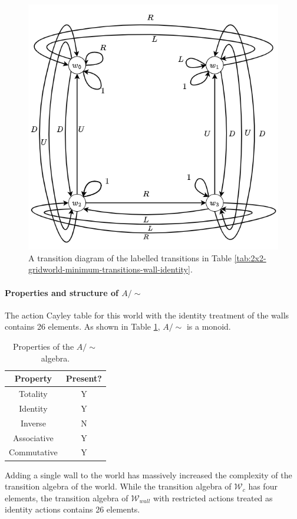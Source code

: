 \begin{figure}
    \centering
    \includegraphics[width=0.5\linewidth]{5BeyondSBDRL/Old/Images/identity-walls-2x2-cyclical-min-actions.drawio.png}
    \caption{
    A transition diagram of the labelled transitions in Table \ref{tab:2x2-gridworld-minimum-transitions-wall-identity}.
    }
    \label{fig:2x2-cyclical-min-actions-wall-identity}
\end{figure}

\paragraph{Properties and structure of $A/\sim$}
The action Cayley table for this world with the identity treatment of the walls contains 26 elements.
As shown in Table \ref{tab:identity-walls-properties}, $A/\sim$ is a monoid.

\begin{table}[H]
    \centering
    \begin{tabular}{c|c}
        \textbf{Property}   & \textbf{Present?} \\
        \hline
        Totality            & Y\\
        Identity            & Y\\
        Inverse             & N\\
        Associative         & Y\\
        Commutative         & Y
    \end{tabular}
    \caption{Properties of the $A/\sim$ algebra.}
    \label{tab:identity-walls-properties}
\end{table}

Adding a single wall to the world has massively increased the complexity of the transition algebra of the world.
While the transition algebra of $\mathscr{W}_{c}$ has four elements, the transition algebra of $\mathscr{W}_{wall}$ with restricted actions treated as identity actions contains 26 elements.

